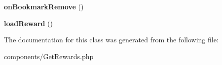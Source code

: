 \begin{DoxyCompactItemize}
\item 
\hypertarget{classDMA_1_1Friends_1_1Components_1_1GetRewards_abcebcc3ca8b1d322c1ce12f4421dd564}{}{\bfseries on\+Bookmark\+Remove} ()\label{classDMA_1_1Friends_1_1Components_1_1GetRewards_abcebcc3ca8b1d322c1ce12f4421dd564}

\item 
\hypertarget{classDMA_1_1Friends_1_1Components_1_1GetRewards_a09c848db3172c50fd381728649c85e02}{}{\bfseries load\+Reward} ()\label{classDMA_1_1Friends_1_1Components_1_1GetRewards_a09c848db3172c50fd381728649c85e02}

\end{DoxyCompactItemize}


The documentation for this class was generated from the following file\+:\begin{DoxyCompactItemize}
\item 
components/Get\+Rewards.\+php\end{DoxyCompactItemize}
